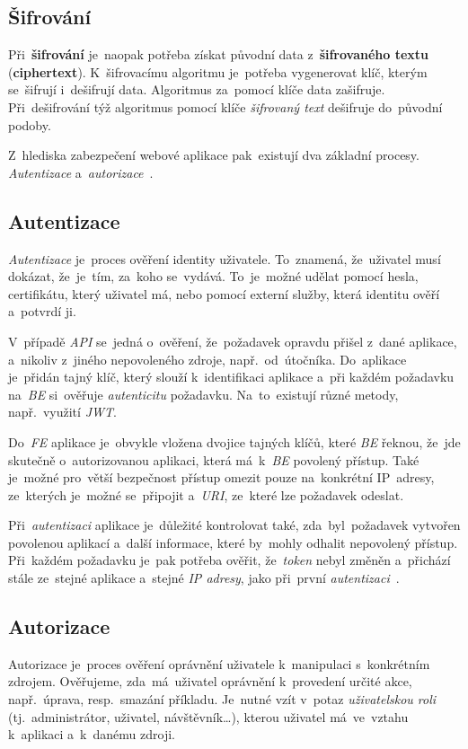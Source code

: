 \documentclass[11pt,a4paper]{report}
\let\oldacrshort\acrshort
\renewcommand{\acrshort}[1]{\emph{\normalsize\color[rgb]{0,0,0}\noindent\oldacrshort{#1}}}
\begin{document}
            \subsection{Šifrování}
                Při~\textbf{šifrování} je~naopak potřeba získat původní data z~\textbf{šifrovaného textu} (\textbf{ciphertext}). K~šifrovacímu algoritmu je~potřeba vygenerovat klíč, kterým se~šifrují i~dešifrují data. Algoritmus za~pomocí klíče data zašifruje. Při~dešifrování týž algoritmus pomocí klíče \emph{šifrovaný text} dešifruje do~původní podoby.

                Z~hlediska zabezpečení webové aplikace pak~existují dva základní procesy. \emph{Autentizace} a~\emph{autorizace}~\cite{graham2021ethical}.

            \subsection{Autentizace}
                \emph{Autentizace} je~proces ověření identity uživatele. To~znamená, že~uživatel musí dokázat, že~je~tím, za~koho se~vydává. To~je~možné udělat pomocí hesla, certifikátu, který uživatel má, nebo pomocí externí služby, která identitu ověří a~potvrdí ji.
                
                V~případě \acrshort{API} se~jedná o~ověření, že~požadavek opravdu přišel z~dané aplikace, a~nikoliv z~jiného nepovoleného zdroje, např.~od~útočníka. Do~aplikace je~přidán tajný klíč, který slouží k~identifikaci aplikace a~při každém požadavku na~\acrshort{BE} si~ověřuje \emph{autenticitu} požadavku. Na~to~existují různé metody, např.~využití \acrshort{JWT}.
                
                Do~\acrshort{FE} aplikace je~obvykle vložena dvojice tajných klíčů, které \acrshort{BE} řeknou, že~jde skutečně o~autorizovanou aplikaci, která má~k~\acrshort{BE} povolený přístup. Také je~možné pro~větší bezpečnost přístup omezit pouze na~konkrétní IP~adresy, ze~kterých je~možné se~připojit a~\acrshort{URI}, ze~které lze požadavek odeslat.

                Při~\emph{autentizaci} aplikace je~důležité kontrolovat také, zda~byl~požadavek vytvořen povolenou aplikací a~další informace, které by~mohly odhalit nepovolený přístup. Při~každém požadavku je~pak potřeba ověřit, že~\emph{token} nebyl změněn a~přichází stále ze~stejné aplikace a~stejné \emph{IP adresy}, jako při~první \emph{autentizaci}~\cite{graham2021ethical}.
            
            \subsection{Autorizace}
                Autorizace je~proces ověření oprávnění uživatele k~manipulaci s~konkrétním zdrojem. Ověřujeme, zda~má~uživatel oprávnění k~provedení určité akce, např.~úprava, resp.~smazání příkladu. Je~nutné vzít v~potaz \emph{uživatelskou roli} (tj.~administrátor, uživatel, návštěvník\dots), kterou uživatel má~ve~vztahu k~aplikaci a~k~danému zdroji.
                
\end{document}
